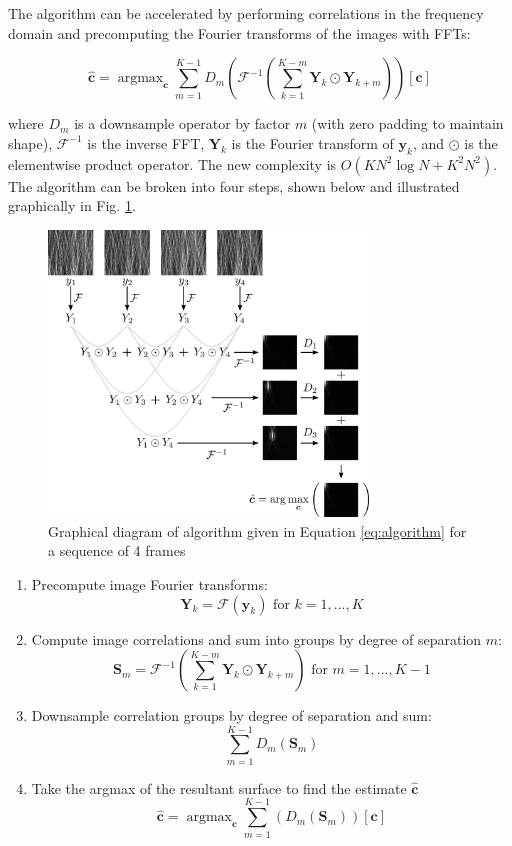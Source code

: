 \documentclass{article}
\DeclareMathOperator*{\argmax}{\arg\max}
\begin{document}
The algorithm can be accelerated by performing correlations in the frequency domain and precomputing the Fourier transforms of the images with FFTs:

\begin{equation}
\hat{\bm{c}} = \argmax_{\bm{c}} \sum_{m=1}^{K-1} D_m \left(
\mathcal{F}^{-1} \left( \sum_{k=1}^{K-m} \bm{Y}_k \odot \bm{Y}_{k+m} \right)
\right)[\bm{c}]
\label{eq:algorithm}
\end{equation}

where $D_m$ is a downsample operator by factor $m$ (with zero padding to maintain shape), $\mathcal{F}^{-1}$ is the inverse FFT, $\bm{Y}_k$ is the Fourier transform of $\bm{y}_k$, and $\odot$ is the elementwise product operator.  The new complexity is $O(KN^2\log N + K^2N^2)$.
The algorithm can be broken into four steps, shown below and illustrated graphically in Fig. \ref{fig:algorithm}.

\begin{figure}[htb]
  \begin{minipage}[b]{1\linewidth}
    \centering
    \centerline{\includegraphics[width=8.5cm]{images/algorithm.png}}
  \end{minipage}
  \caption{Graphical diagram of algorithm given in Equation \ref{eq:algorithm} for a sequence of 4 frames}
  \label{fig:algorithm}
\end{figure}

\begin{enumerate}
  \item Precompute image Fourier transforms:
    $$\bm{Y}_k=\mathcal{F}(\bm{y}_k) \text{ for } k=1,...,K$$
  \item Compute image correlations and sum into groups by degree of separation $m$:
    $$\bm{S}_m = \mathcal{F}^{-1} \left( \sum_{k=1}^{K-m} \bm{Y}_k \odot \bm{Y}_{k+m} \right) \text{ for } m=1, ..., K-1$$
  \item Downsample correlation groups by degree of separation and sum:
    $$\sum_{m=1}^{K-1} D_m \left( \bm{S}_m \right)$$
  \item Take the argmax of the resultant surface to find the estimate $\hat{\bm{c}}$
    $$\hat{\bm{c}} = \argmax_{\bm{c}} \sum_{m=1}^{K-1} \left(D_m \left( \bm{S}_m \right)\right)[\bm{c}]$$
\end{enumerate}
\end{document}
